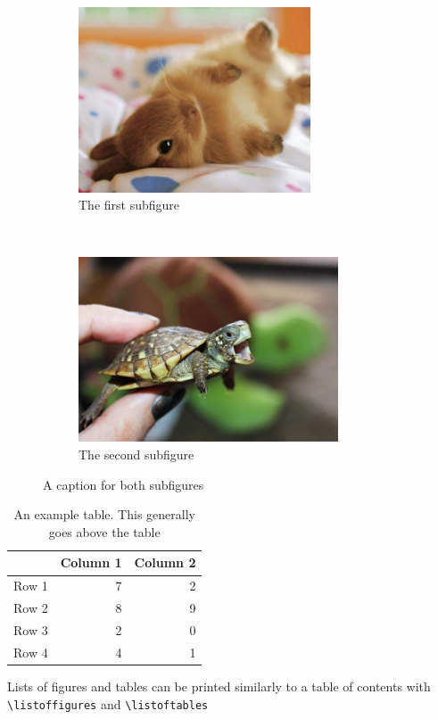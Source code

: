\documentclass{article}
\begin{document}
\begin{figure}[h]
    \centering
    \begin{subfigure}{0.47\textwidth}
        \includegraphics[height=5.5cm]{rabbit.jpg}
        \caption{The first subfigure}
    \end{subfigure}
    ~
    \begin{subfigure}{0.47\textwidth}
        \includegraphics[height=5.5cm]{turtle.jpg}
        \caption{The second subfigure}
        \label{fig:turtle}
    \end{subfigure}
    \caption{A caption for both subfigures}
\end{figure}

\begin{table}[h]
    \centering
    \caption{An example table. This generally goes above the table}
    \begin{tabular}{lrr}
      \toprule
      & Column 1 & Column 2 \\
      \midrule
      Row 1 & 7 & 2 \\
      Row 2 & 8 & 9 \\
      Row 3 & 2 & 0 \\
      Row 4 & 4 & 1 \\
      \bottomrule
    \end{tabular}
\end{table}

Lists of figures and tables can be printed similarly to a table of contents with \lstinline{\listoffigures} and  \lstinline{\listoftables}
\end{document}
